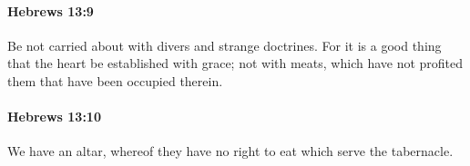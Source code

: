 		\paragraph{Hebrews 13:9} %
			\label{HEBREWS-13-9}

			Be not carried about with divers and strange doctrines. For it is a good thing that the heart be established with grace; not with meats, which have not profited them that have been occupied therein.

			\begin{framed}
			\scriptsize
				\begin{compactdesc}
					\item[SBLG] 
				\end{compactdesc}
			\end{framed}

		\paragraph{Hebrews 13:10} %
			\label{HEBREWS-13-10}

			We have an altar, whereof they have no right to eat which serve the tabernacle.

